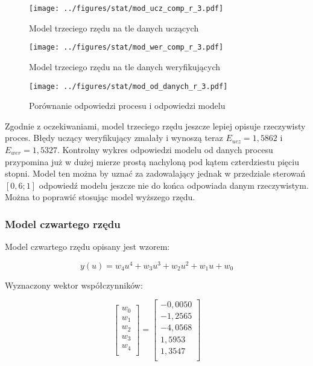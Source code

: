 \documentclass[a4paper,titlepage,11pt,floatssmall]{mwrep}
\begin{document}
\newpage

\begin{figure}[H]
\centering
\texttt{[image: ../figures/stat/mod\_ucz\_comp\_r\_3.pdf]}
\caption{Model trzeciego rzędu na tle danych uczących}
\end{figure}

\begin{figure}[H]
\centering
\texttt{[image: ../figures/stat/mod\_wer\_comp\_r\_3.pdf]}
\caption{Model trzeciego rzędu na tle danych weryfikujących}
\end{figure}

\newpage

\begin{figure}[H]
\centering
\texttt{[image: ../figures/stat/mod\_od\_danych\_r\_3.pdf]}
\caption{Porównanie odpowiedzi procesu i odpowiedzi modelu}
\end{figure}

Zgodnie z oczekiwaniami, model trzeciego rzędu jeszcze lepiej opisuje rzeczywisty proces. Błędy uczący weryfikujący zmalały i wynoszą teraz $E_{ucz} = 1,5862$ i $E_{wer} = 1,5327$. Kontrolny wykres odpowiedzi modelu od danych procesu przypomina już w dużej mierze prostą nachyloną pod kątem czterdziestu pięciu stopni. Model ten można by uznać za zadowalający jednak w przedziale sterowań $[0,6 ; 1]$ odpowiedź modelu jeszcze nie do końca odpowiada danym rzeczywistym. Można to poprawić stosując model wyższego rzędu.

\subsubsection{Model czwartego rzędu}

Model czwartego rzędu opisany jest wzorem:

\begin{equation*}
y(u) = w_4u^4 + w_3u^3 + w_2u^2 + w_1u + w_0
\end{equation*}

Wyznaczony wektor współczynników:

$$
\left[\begin{array}{c}
w_0 \\
w_1 \\
w_2 \\
w_3 \\
w_4 \\
\end{array} \right]
= 
\left[\begin{array}{c}
-0,0050	\\
-1,2565 \\
-4,0568 \\
1,5953 \\
1,3547 \\ 
\end{array} \right]
$$
\end{document}
